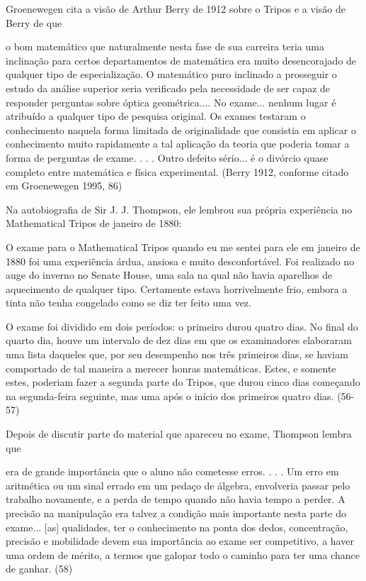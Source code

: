 \documentclass[a4paper,12pt]{article}[abntex2]
\begin{document}
Groenewegen cita a visão de Arthur Berry de 1912 sobre o Tripos e a visão de Berry de que

o bom matemático que naturalmente nesta fase de sua carreira teria uma inclinação para certos departamentos de matemática era muito desencorajado de qualquer tipo de especialização. O matemático puro inclinado a prosseguir o estudo da análise superior seria verificado pela necessidade de ser capaz de responder perguntas sobre óptica geométrica.... No exame... nenhum lugar é atribuído a qualquer tipo de pesquisa original. Os exames testaram o conhecimento naquela forma limitada de originalidade que consistia em aplicar o conhecimento muito rapidamente a tal aplicação da teoria que poderia tomar a forma de perguntas de exame. . . . Outro defeito sério... é o divórcio quase completo entre matemática e física experimental. (Berry 1912, conforme citado em Groenewegen 1995, 86)

Na autobiografia de Sir J. J. Thompson, ele lembrou sua própria experiência no Mathematical Tripos de janeiro de 1880:

O exame para o Mathematical Tripos quando eu me sentei para ele em janeiro de 1880 foi uma experiência árdua, ansiosa e muito desconfortável. Foi realizado no auge do inverno no Senate House, uma sala na qual não havia aparelhos de aquecimento de qualquer tipo. Certamente estava horrivelmente frio, embora a tinta não tenha congelado como se diz ter feito uma vez.

O exame foi dividido em dois períodos: o primeiro durou quatro dias. No final do quarto dia, houve um intervalo de dez dias em que os examinadores elaboraram uma lista daqueles que, por seu desempenho nos três primeiros dias, se haviam comportado de tal maneira a merecer honras matemáticas. Estes, e somente estes, poderiam fazer a segunda parte do Tripos, que durou cinco dias começando na segunda-feira seguinte, mas uma após o início dos primeiros quatro dias. (56-57)

Depois de discutir parte do material que apareceu no exame, Thompson lembra que

era de grande importância que o aluno não cometesse erros. . . . Um erro em aritmética ou um sinal errado em um pedaço de álgebra, envolveria passar pelo trabalho novamente, e a perda de tempo quando não havia tempo a perder. A precisão na manipulação era talvez a condição mais importante nesta parte do exame... [as] qualidades, ter o conhecimento na ponta dos dedos, concentração, precisão e mobilidade devem sua importância ao exame ser competitivo, a haver uma ordem de mérito, a termos que galopar todo o caminho para ter uma chance de ganhar. (58)
\end{document}
